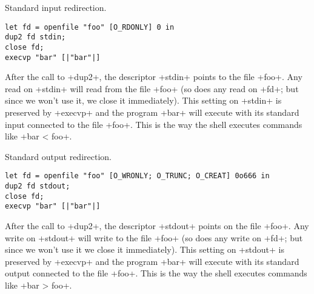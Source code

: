 \begin{myimage}[width="80\%"]
\end{myimage}

\begin{example} 
Standard input redirection.
%
\begin{lstlisting}
let fd = openfile "foo" [O_RDONLY] 0 in
dup2 fd stdin;
close fd;
execvp "bar" [|"bar"|]
\end{lstlisting}
% 
After the call to \ml+dup2+, the descriptor \ml+stdin+ points to the
file \ml+foo+. Any read on \ml+stdin+ will read from the file \ml+foo+
(so does any read on \ml+fd+; but since we won't use it, we close it
immediately). This setting on \ml+stdin+ is preserved by \ml+execvp+
and  the program \ml+bar+ will execute with its standard input
connected to the file \ml+foo+. This is the way the shell executes
commands like \ml+bar < foo+.
\end{example}

\begin{example} 
Standard output redirection.
%
\begin{lstlisting}
let fd = openfile "foo" [O_WRONLY; O_TRUNC; O_CREAT] 0o666 in
dup2 fd stdout;
close fd;
execvp "bar" [|"bar"|]
\end{lstlisting}
% 
After the call to \ml+dup2+, the descriptor \ml+stdout+ points on
the file \ml+foo+. Any write on \ml+stdout+ will write to the file
\ml+foo+ (so does any write on \ml+fd+; but since we won't use it we
close it immediately). This setting on \ml+stdout+ is preserved by
\ml+execvp+ and the program \ml+bar+ will execute with its standard output
connected to the file \ml+foo+. This is the way the shell executes
commands like \ml+bar > foo+.
\end{example}


